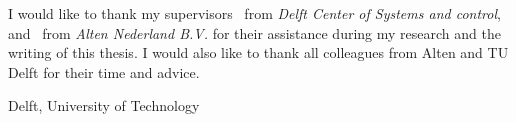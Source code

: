 \documentclass[a4paper,11pt]{mscThesis}
\begin{document}
%
\frontmatter %
%
\maketitle
%

%
    I would like to thank my supervisors \mscsupervisorone\ from \textit{Delft Center of Systems and control}, and \mscsupervisortwo\ from \textit{Alten Nederland B.V.} for their assistance during my research and the writing of this thesis. I would also like to thank all colleagues from Alten and TU Delft for their time and advice.
    \vspace*{15mm}

    \noindent
    Delft, University of Technology \hfill \mscname\\
    \mscdate

%
    \tocloflot
%
    
    \cleardoublepage%
%
%
\mainmatter
%
%
%





%

%

%

%


	
\appendix



\backmatter
	
	
	

	
	\printindex

	\printnomenclature[2 cm]




\end{document}
